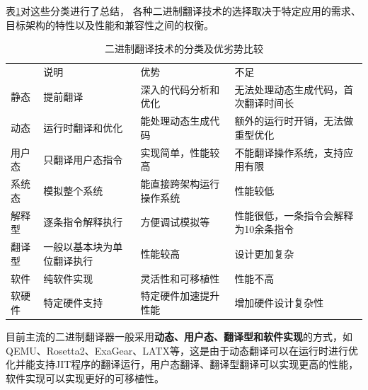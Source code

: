 表\ref{tab:BTs}对这些分类进行了总结，
各种二进制翻译技术的选择取决于特定应用的需求、目标架构的特性以及性能和兼容性之间的权衡。

\begin{table}[]
  \caption{二进制翻译技术的分类及优劣势比较}
  \label{tab:BTs}
  \begin{adjustbox}{width=\textwidth}
  \begin{tabular}{llll}
  \rowcolor[HTML]{FFCE93} 
      & 说明                  & 优势           & 不足                  \\
  静态  & 提前翻译                & 深入的代码分析和优化   & 无法处理动态生成代码，首次翻译时间长  \\
  动态  & 运行时翻译和优化            & 能处理动态生成代码    & 额外的运行时开销，无法做重型优化    \\
  \hline
  用户态 & 只翻译用户态指令            & 实现简单，性能较高    & 不能翻译操作系统，支持应用有限     \\
  系统态 &  模拟整个系统 & 能直接跨架构运行操作系统 & 性能较低                \\
  \hline
  解释型 & 逐条指令解释执行            & 方便调试模拟等      & 性能很低，一条指令会解释为10余条指令 \\
  翻译型 & 一般以基本块为单位翻译执行       & 性能较高         & 设计更加复杂              \\
  \hline
  软件  & 纯软件实现               & 灵活性和可移植性     & 性能不高                \\
  软硬件 & 特定硬件支持    & 特定硬件加速提升性能   & 增加硬件设计复杂性          
  \end{tabular}
  \end{adjustbox}
  \end{table}

目前主流的二进制翻译器一般采用\textbf{动态、用户态、翻译型和软件实现}的方式，如QEMU\cite{bellardQEMUFastPortable2005}、Rosetta2\cite{RosettaTranslationEnvironment, RunningIntelBinaries}、ExaGear\cite{KunPengExaGear}、LATX\cite{LoongArchEnv2022, LoongArch2023}等，这是由于动态翻译可以在运行时进行优化并能支持JIT程序的翻译运行，用户态翻译、翻译型翻译可以实现更高的性能，软件实现可以实现更好的可移植性。


